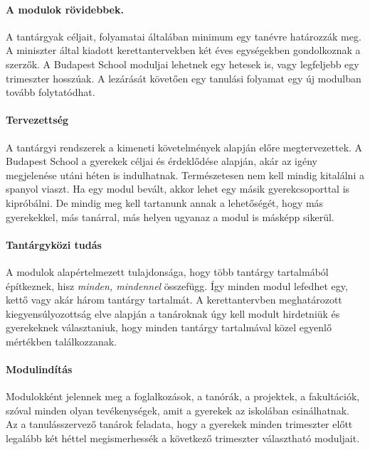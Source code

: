 \paragraph{A modulok rövidebbek.}

A tantárgyak céljait, folyamatai általában minimum egy tanévre
határozzák meg. A miniszter által kiadott kerettantervekben két éves
egységekben gondolkoznak a szerzők. A Budapest School moduljai lehetnek
egy hetesek is, vagy legfeljebb egy trimeszter hosszúak. A lezárását
követően egy tanulási folyamat egy új modulban tovább folytatódhat.

\paragraph{Tervezettség}\label{tervezettsuxe9g}

A tantárgyi rendszerek a kimeneti követelmények alapján előre
megtervezettek. A Budapest School a gyerekek céljai és érdeklődése
alapján, akár az igény megjelenése utáni héten is indulhatnak.
Természetesen nem kell mindig kitalálni a spanyol viaszt. Ha egy modul
bevált, akkor lehet egy másik gyerekcsoporttal is kipróbálni. De mindig
meg kell tartanunk annak a lehetőségét, hogy más gyerekekkel, más
tanárral, más helyen ugyanaz a modul is másképp sikerül.

\paragraph{Tantárgyközi tudás}\label{tantuxe1rgykuxf6zi-tuduxe1s}

A modulok alapértelmezett tulajdonsága, hogy több tantárgy tartalmából
építkeznek, hisz \emph{minden, mindennel} összefügg. Így minden modul
lefedhet egy, kettő vagy akár három tantárgy tartalmát. A
kerettantervben meghatározott kiegyensúlyozottság elve alapján a
tanároknak úgy kell modult hirdetniük és gyerekeknek választaniuk, hogy
minden tantárgy tartalmával közel egyenlő mértékben találkozzanak.

\paragraph{Modulindítás}\label{modulinduxedtuxe1s}

Modulokként jelennek meg a foglalkozások, a tanórák, a projektek, a
fakultációk, szóval minden olyan tevékenységek, amit a gyerekek az
iskolában csinálhatnak. Az a tanulásszervező tanárok feladata, hogy a
gyerekek minden trimeszter előtt legalább két héttel megismerhessék a
következő trimeszter választható moduljait.

